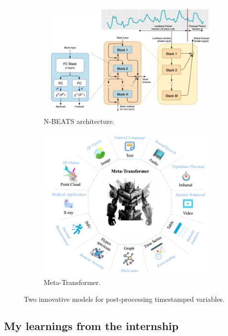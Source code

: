 \begin{figure}[htb!]
    \begin{subfigure}[h]{0.4\linewidth}
        \includegraphics[width=\columnwidth]{figures/n-beats.png}
        \caption{N-BEATS architecture.}
    \end{subfigure}
    \hfill
    \begin{subfigure}[h]{0.4\linewidth}
        \includegraphics[width=\columnwidth]{figures/meta-transformer.png}
        \caption{Meta-Transformer.}
    \end{subfigure}
    \caption{Two innovative models for post-processing timestamped variables.}
    \label{fig:innovative_models}
\end{figure}
\subsection{My learnings from the internship}